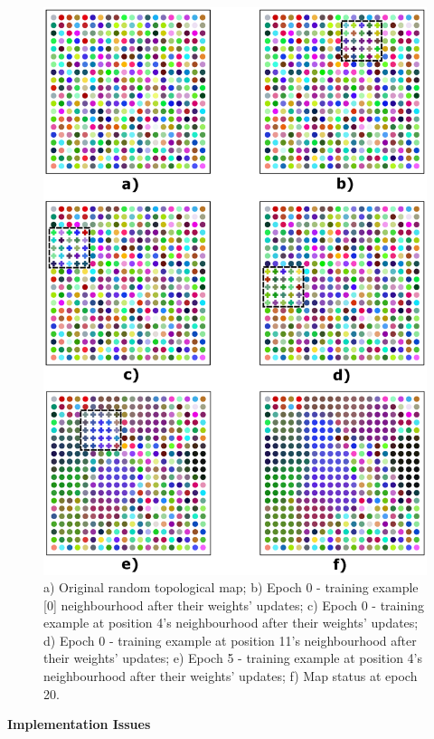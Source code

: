 \begin{figure}[h!]
\centering
\includegraphics[scale=0.35]{figs/SOM_Exec.eps}
\caption{a) Original random topological map; b) Epoch 0 - training example [0] neighbourhood after their weights' updates; c) Epoch 0 - training example at position 4's  neighbourhood after their weights' updates; d) Epoch 0 - training example at position 11's neighbourhood after their weights' updates; e) Epoch 5 - training example at position 4's neighbourhood after their weights' updates; f) Map status at epoch 20.}
\label{fig:execution}
\end{figure}



\vspace{0.2cm}

\noindent \textbf{Implementation Issues}

